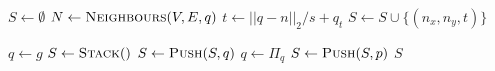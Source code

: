 \begin{algorithm}[ht]
    \caption{$\Function{GetTemporalNeighbours}(V, E, q)$}
    \label{algo:neighbours}
    \begin{algorithmic}[1]
        \setcounter{ALC@line}{0}
        \vspace*{1mm}
        \STATE $S \leftarrow \emptyset$
        \STATE $N \leftarrow \Function{Neighbours}(V, E, q)$
            \STATE $t \leftarrow ||q - n||_2 / s + q_t$
            \STATE $S \leftarrow S \cup \{(n_x, n_y, t)\}$
        \ENDFOR
    \end{algorithmic}
\end{algorithm}

\begin{algorithm}[ht]
    \caption{$\Function{BacktrackPath}(p, g, \Pi)$}
    \label{algo:backtrack}
    \begin{algorithmic}[1]
        \setcounter{ALC@line}{0}
        \vspace*{1mm}
        \STATE $q \leftarrow g$
        \STATE $S \leftarrow \Function{Stack}()$
            \STATE $S \leftarrow \Function{Push}(S, q)$
            \STATE $q \leftarrow \Pi_q$
        \ENDWHILE
        \STATE $S \leftarrow \Function{Push}(S, p)$
        \RETURN $S$
    \end{algorithmic}
\end{algorithm}


